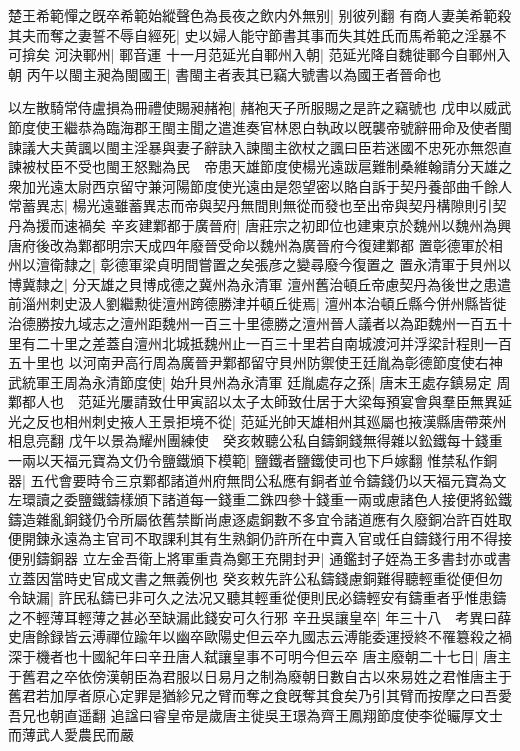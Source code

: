 楚王希範憚之旣卒希範始縱聲色為長夜之飲内外無别|{
	别彼列翻}
有商人妻美希範殺其夫而奪之妻誓不辱自經死|{
	史以婦人能守節書其事而失其姓氏而馬希範之淫暴不可揜矣}
河決鄆州|{
	鄆音運}
十一月范延光自鄆州入朝|{
	范延光降自魏徙鄆今自鄆州入朝}
丙午以閩主昶為閩國王|{
	書閩主者表其已竊大號書以為國王者晉命也}


以左散騎常侍盧損為冊禮使賜昶赭袍|{
	赭袍天子所服賜之是許之竊號也}
戊申以威武節度使王繼恭為臨海郡王閩主聞之遣進奏官林恩白執政以旣襲帝號辭冊命及使者閩諫議大夫黄諷以閩主淫暴與妻子辭訣入諫閩主欲杖之諷曰臣若迷國不忠死亦無怨直諫被杖臣不受也閩王怒黜為民　帝患天雄節度使楊光遠跋扈難制桑維翰請分天雄之衆加光遠太尉西京留守兼河陽節度使光遠由是怨望密以賂自訴于契丹養部曲千餘人常蓄異志|{
	楊光遠雖蓄異志而帝與契丹無間則無從而發也至出帝與契丹構隙則引契丹為援而速禍矣}
辛亥建鄴都于廣晉府|{
	唐莊宗之初即位也建東京於魏州以魏州為興唐府後改為鄴都明宗天成四年廢晉受命以魏州為廣晉府今復建鄴都}
置彰德軍於相州以澶衛隸之|{
	彰德軍梁貞明間嘗置之矣張彦之變尋廢今復置之}
置永清軍于貝州以博冀隸之|{
	分天雄之貝博成德之冀州為永清軍}
澶州舊治頓丘帝慮契丹為後世之患遣前淄州刺史汲人劉繼勲徙澶州跨德勝津并頓丘徙焉|{
	澶州本治頓丘縣今併州縣皆徙治德勝按九域志之澶州距魏州一百三十里德勝之澶州晉人議者以為距魏州一百五十里有二十里之差蓋自澶州北城抵魏州止一百三十里若自南城渡河并浮梁計程則一百五十里也}
以河南尹高行周為廣晉尹鄴都留守貝州防禦使王廷胤為彰德節度使右神武統軍王周為永清節度使|{
	始升貝州為永清軍}
廷胤處存之孫|{
	唐末王處存鎮易定}
周鄴都人也　范延光屢請致仕甲寅詔以太子太師致仕居于大梁每預宴會與羣臣無異延光之反也相州刺史掖人王景拒境不從|{
	范延光帥天雄相州其廵屬也掖漢縣唐帶萊州相息亮翻}
戊午以景為耀州團練使　癸亥敇聽公私自鑄銅錢無得雜以鈆鐵每十錢重一兩以天福元寶為文仍令鹽鐵頒下模範|{
	鹽鐵者鹽鐵使司也下戶嫁翻}
惟禁私作銅器|{
	五代會要時令三京鄴都諸道州府無問公私應有銅者並令鑄錢仍以天福元寶為文左環讀之委鹽鐵鑄樣頒下諸道每一錢重二銖四參十錢重一兩或慮諸色人接便將鈆鐵鑄造雜亂銅錢仍令所屬依舊禁斷尚慮逐處銅數不多宜令諸道應有久廢銅冶許百姓取便開鍊永遠為主官司不取課利其有生熟銅仍許所在中賣入官或任自鑄錢行用不得接便别鑄銅器}
立左金吾衛上將軍重貴為鄭王充開封尹|{
	通鑑封子姪為王多書封亦或書立蓋因當時史官成文書之無義例也}
癸亥敕先許公私鑄錢慮銅難得聽輕重從便但勿令缺漏|{
	許民私鑄已非可久之法况又聽其輕重從便則民必鑄輕安有鑄重者乎惟患鑄之不輕薄耳輕薄之甚必至缺漏此錢安可久行邪}
辛丑吳讓皇卒|{
	年三十八　考異曰薛史唐餘録皆云溥禪位踰年以幽卒歐陽史但云卒九國志云溥能委運授終不罹簒殺之禍深于機者也十國紀年曰辛丑唐人弑讓皇事不可明今但云卒}
唐主廢朝二十七日|{
	唐主于舊君之卒依傍漢朝臣為君服以日易月之制為廢朝日數自古以來易姓之君惟唐主于舊君若加厚者原心定罪是猶紾兄之臂而奪之食旣奪其食矣乃引其臂而按摩之曰吾愛吾兄也朝直遥翻}
追諡曰睿皇帝是歲唐主徙吳王璟為齊王鳳翔節度使李從曮厚文士而薄武人愛農民而嚴

